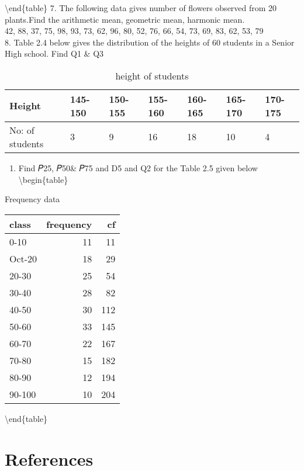 \documentclass[
]{book}
\providecommand{\tightlist}{%
  \setlength{\itemsep}{0pt}\setlength{\parskip}{0pt}}
\begin{document}
\textbackslash end\{table\}
7. The following data gives number of flowers observed from 20 plants.Find the arithmetic mean, geometric mean, harmonic mean.\\
42, 88, 37, 75, 98, 93, 73, 62, 96, 80, 52, 76, 66, 54, 73, 69, 83, 62, 53, 79\\
8. Table 2.4 below gives the distribution of the heights of 60 students in a Senior High school. Find Q1 \& Q3\\

\begin{table}

\caption{\label{tab:t4}height of students}
\centering
\begin{tabular}[t]{l|l|l|l|l|l|l}
\hline
Height & 145-150 & 150-155 & 155-160 & 160-165 & 165-170 & 170-175\\
\hline
No: of students & 3 & 9 & 16 & 18 & 10 & 4\\
\hline
\end{tabular}
\end{table}

\begin{enumerate}
\def\labelenumi{\arabic{enumi}.}
\setcounter{enumi}{8}
\tightlist
\item
  Find 𝑃25, 𝑃50\& 𝑃75 and D5 and Q2 for the Table 2.5 given below
  \textbackslash begin\{table\}
\end{enumerate}

\caption{\label{tab:t5}Frequency data}
\centering
\begin{tabular}[t]{l|r|r}
\hline
class & frequency & cf\\
\hline
0-10 & 11 & 11\\
\hline
Oct-20 & 18 & 29\\
\hline
20-30 & 25 & 54\\
\hline
30-40 & 28 & 82\\
\hline
40-50 & 30 & 112\\
\hline
50-60 & 33 & 145\\
\hline
60-70 & 22 & 167\\
\hline
70-80 & 15 & 182\\
\hline
80-90 & 12 & 194\\
\hline
90-100 & 10 & 204\\
\hline
\end{tabular}

\textbackslash end\{table\}

\hypertarget{references}{%
\chapter{References}\label{references}}
\end{document}
